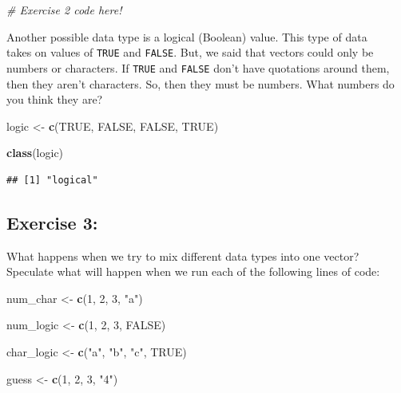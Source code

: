 \documentclass[
  10pt,
  letterpaper,
  twoside,
  openright]{book}
\newenvironment{Shaded}{\begin{snugshade}}{\end{snugshade}}
\newcommand{\CommentTok}[1]{\textcolor[rgb]{0.56,0.35,0.01}{\textit{#1}}}
\newcommand{\ConstantTok}[1]{\textcolor[rgb]{0.56,0.35,0.01}{#1}}
\newcommand{\DecValTok}[1]{\textcolor[rgb]{0.00,0.00,0.81}{#1}}
\newcommand{\FunctionTok}[1]{\textcolor[rgb]{0.13,0.29,0.53}{\textbf{#1}}}
\newcommand{\NormalTok}[1]{#1}
\newcommand{\OtherTok}[1]{\textcolor[rgb]{0.56,0.35,0.01}{#1}}
\newcommand{\StringTok}[1]{\textcolor[rgb]{0.31,0.60,0.02}{#1}}
\begin{document}
\begin{Shaded}
\begin{Highlighting}[]
\CommentTok{\# Exercise 2 code here!}
\end{Highlighting}
\end{Shaded}

Another possible data type is a logical (Boolean) value. This type of
data\\
takes on values of \texttt{TRUE} and \texttt{FALSE}. But, we said that
vectors could only be numbers or characters. If \texttt{TRUE} and
\texttt{FALSE} don't have quotations around them, then they aren't
characters. So, then they must be numbers. What numbers do you think
they are?

\begin{Shaded}
\begin{Highlighting}[]
\NormalTok{logic }\OtherTok{\textless{}{-}} \FunctionTok{c}\NormalTok{(}\ConstantTok{TRUE}\NormalTok{, }\ConstantTok{FALSE}\NormalTok{, }\ConstantTok{FALSE}\NormalTok{, }\ConstantTok{TRUE}\NormalTok{)}

\FunctionTok{class}\NormalTok{(logic)}
\end{Highlighting}
\end{Shaded}

\begin{verbatim}
## [1] "logical"
\end{verbatim}

\hypertarget{exercise-3}{%
\subsection{Exercise 3:}\label{exercise-3}}

What happens when we try to mix different data types into one vector?
Speculate what will happen when we run each of the following lines of
code:

\begin{Shaded}
\begin{Highlighting}[]
\NormalTok{num\_char }\OtherTok{\textless{}{-}} \FunctionTok{c}\NormalTok{(}\DecValTok{1}\NormalTok{, }\DecValTok{2}\NormalTok{, }\DecValTok{3}\NormalTok{, }\StringTok{"a"}\NormalTok{)}

\NormalTok{num\_logic }\OtherTok{\textless{}{-}} \FunctionTok{c}\NormalTok{(}\DecValTok{1}\NormalTok{, }\DecValTok{2}\NormalTok{, }\DecValTok{3}\NormalTok{, }\ConstantTok{FALSE}\NormalTok{)}

\NormalTok{char\_logic }\OtherTok{\textless{}{-}} \FunctionTok{c}\NormalTok{(}\StringTok{"a"}\NormalTok{, }\StringTok{"b"}\NormalTok{, }\StringTok{"c"}\NormalTok{, }\ConstantTok{TRUE}\NormalTok{)}

\NormalTok{guess }\OtherTok{\textless{}{-}} \FunctionTok{c}\NormalTok{(}\DecValTok{1}\NormalTok{, }\DecValTok{2}\NormalTok{, }\DecValTok{3}\NormalTok{, }\StringTok{"4"}\NormalTok{)}
\end{Highlighting}
\end{Shaded}
\end{document}
